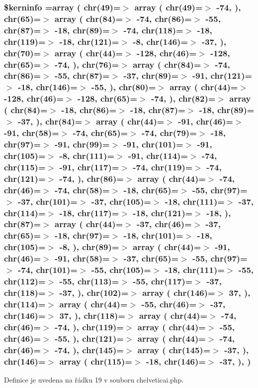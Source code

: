 \hypertarget{chelveticai_8php_ab4bb7d3b0332c517f6a42a1924f01000}{
\subsubsection[{\$kerninfo}]{\setlength{\rightskip}{0pt plus 5cm}\$kerninfo =array ( chr(49)=$>$ array ( chr(49)=$>$ -\/74, ), chr(65)=$>$ array ( chr(84)=$>$ -\/74, chr(86)=$>$ -\/55, chr(87)=$>$ -\/18, chr(89)=$>$ -\/74, chr(118)=$>$ -\/18, chr(119)=$>$ -\/18, chr(121)=$>$ -\/8, chr(146)=$>$ -\/37, ), chr(70)=$>$ array ( chr(44)=$>$ -\/128, chr(46)=$>$ -\/128, chr(65)=$>$ -\/74, ), chr(76)=$>$ array ( chr(84)=$>$ -\/74, chr(86)=$>$ -\/55, chr(87)=$>$ -\/37, chr(89)=$>$ -\/91, chr(121)=$>$ -\/18, chr(146)=$>$ -\/55, ), chr(80)=$>$ array ( chr(44)=$>$ -\/128, chr(46)=$>$ -\/128, chr(65)=$>$ -\/74, ), chr(82)=$>$ array ( chr(84)=$>$ -\/18, chr(86)=$>$ -\/18, chr(87)=$>$ -\/18, chr(89)=$>$ -\/37, ), chr(84)=$>$ array ( chr(44)=$>$ -\/91, chr(46)=$>$ -\/91, chr(58)=$>$ -\/74, chr(65)=$>$ -\/74, chr(79)=$>$ -\/18, chr(97)=$>$ -\/91, chr(99)=$>$ -\/91, chr(101)=$>$ -\/91, chr(105)=$>$ -\/8, chr(111)=$>$ -\/91, chr(114)=$>$ -\/74, chr(115)=$>$ -\/91, chr(117)=$>$ -\/74, chr(119)=$>$ -\/74, chr(121)=$>$ -\/74, ), chr(86)=$>$ array ( chr(44)=$>$ -\/74, chr(46)=$>$ -\/74, chr(58)=$>$ -\/18, chr(65)=$>$ -\/55, chr(97)=$>$ -\/37, chr(101)=$>$ -\/37, chr(105)=$>$ -\/18, chr(111)=$>$ -\/37, chr(114)=$>$ -\/18, chr(117)=$>$ -\/18, chr(121)=$>$ -\/18, ), chr(87)=$>$ array ( chr(44)=$>$ -\/37, chr(46)=$>$ -\/37, chr(65)=$>$ -\/18, chr(97)=$>$ -\/18, chr(101)=$>$ -\/18, chr(105)=$>$ -\/8, ), chr(89)=$>$ array ( chr(44)=$>$ -\/91, chr(46)=$>$ -\/91, chr(58)=$>$ -\/37, chr(65)=$>$ -\/55, chr(97)=$>$ -\/74, chr(101)=$>$ -\/55, chr(105)=$>$ -\/18, chr(111)=$>$ -\/55, chr(112)=$>$ -\/55, chr(113)=$>$ -\/55, chr(117)=$>$ -\/37, chr(118)=$>$ -\/37, ), chr(102)=$>$ array ( chr(146)=$>$ 37, ), chr(114)=$>$ array ( chr(44)=$>$ -\/55, chr(46)=$>$ -\/37, chr(146)=$>$ 37, ), chr(118)=$>$ array ( chr(44)=$>$ -\/74, chr(46)=$>$ -\/74, ), chr(119)=$>$ array ( chr(44)=$>$ -\/55, chr(46)=$>$ -\/55, ), chr(121)=$>$ array ( chr(44)=$>$ -\/74, chr(46)=$>$ -\/74, ), chr(145)=$>$ array ( chr(145)=$>$ -\/37, ), chr(146)=$>$ array ( chr(115)=$>$ -\/18, chr(146)=$>$ -\/37, ), )}}\label{chelveticai_8php_ab4bb7d3b0332c517f6a42a1924f01000}


Definice je uvedena na řádku 19 v souboru chelveticai.\-php.

